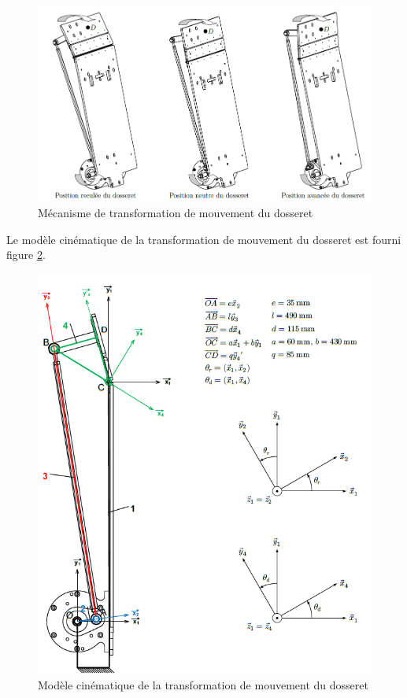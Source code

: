 \begin{figure}[!ht]
\begin{center}
 \includegraphics[width=0.9\linewidth]{img/img07}
\end{center}
\caption{Mécanisme de transformation de mouvement du dosseret}
\label{fig7}
\end{figure}

Le modèle cinématique de la transformation de mouvement du dosseret est fourni figure \ref{fig8}.

\begin{figure}[!ht]
\begin{center}
 \includegraphics[width=0.65\linewidth]{img/img08}
\end{center}
\caption{Modèle cinématique de la transformation de mouvement du dosseret}
\label{fig8}
\end{figure}


